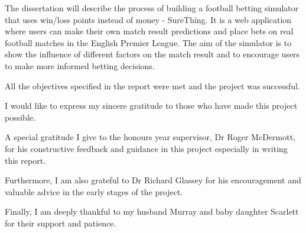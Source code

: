 \beforeabstract
{}
The dissertation will describe the process of building a football betting simulator that uses win/loss points instead of money - SureThing. It is a web application where users can make their own match result predictions and place bets on real football matches in the English Premier League. The aim of the simulator is to show the influence of different factors on the match result and to encourage users to make more informed betting decisions.

All the objectives specified in the report were met and the project was successful.

I would like to express my sincere gratitude to those who have made this project possible. 

A special gratitude I give to the honours year supervisor, Dr Roger McDermott, for his constructive feedback and guidance in this project especially in writing this report. 

Furthermore, I am also grateful to Dr Richard Glassey for his encouragement and valuable advice in the early stages of the project.

Finally, I am deeply thankful to my husband Murray and baby daughter Scarlett for their support and patience.

\afterpreface
\afterabstract
